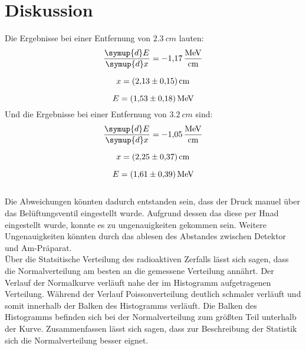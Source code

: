 \section{Diskussion}
\label{sec:Diskussion}
Die Ergebnisse bei einer Entfernung von $\qty{2.3}{cm}$ lauten:
\begin{equation*}
    \frac{\symup{d}E}{\symup{d}x}=\qty{-1.17}{\mega\electronvolt\per\centi\meter}
\end{equation*}

\begin{equation*}
   x = \qty{2.13 \pm 0.15}{cm}
\end{equation*}
   
\begin{equation*}
    E = \qty{1.53 \pm 0.18}{MeV}
\end{equation*}
Und die Ergebnisse bei einer Entfernung von $\qty{3.2}{cm}$ sind:
\begin{equation*}
    \frac{\symup{d}E}{\symup{d}x}=\qty{-1.05}{\mega\electronvolt\per\centi\meter}
\end{equation*}

\begin{equation*}
   x = \qty{2.25 \pm 0.37}{cm}
\end{equation*}
   
\begin{equation*}
    E = \qty{1.61 \pm 0.39}{MeV}
\end{equation*}
\\


Die Abweichungen könnten dadurch entstanden sein, dass 
der Druck manuel über das Belüftungsventil eingestellt wurde.
Aufgrund dessen das diese per Hnad eingestellt wurde, konnte es zu ungenauigkeiten gekommen sein. 
Weitere Ungenauigkeiten könnten durch das ablesen des Abstandes zwischen Detektor und Am-Präparat.\\


Über die Statsitische Verteilung des radioaktiven Zerfalls lässt sich sagen, dass 
die Normalverteilung am besten an die gemessene Verteilung annährt.
Der Verlauf der Normalkurve verläuft nahe der im Histogramm aufgetragenen Verteilung.
Während der Verlauf Poissonverteilung deutlich schmaler verläuft und somit innerhalb der Balken des Histogramms verläuft.
Die Balken des Histogramms befinden sich bei der Normalverteilung zum größten Teil unterhalb der Kurve.
Zusammenfassen lässt sich sagen, dass zur Beschreibung der Statistik sich die Normalverteilung besser eignet.
